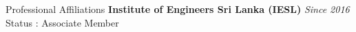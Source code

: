 \documentclass[
11pt, %
]{./assets/resume} %
\begin{document}
\begin{rSection}{Professional Affiliations}
	\textbf{Institute of Engineers Sri Lanka (IESL)} \hfill \textit{Since 2016}\\
	Status : Associate Member
	
\end{rSection}













\end{document}
